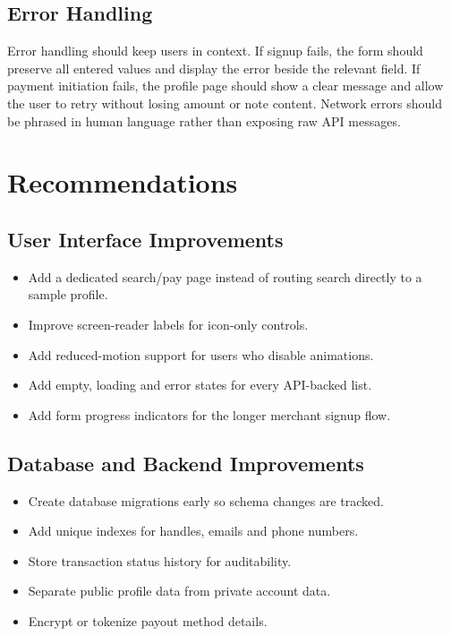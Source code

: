 \documentclass[12pt,a4paper]{article}
\begin{document}
\subsection{Error Handling}
Error handling should keep users in context. If signup fails, the form should preserve all entered values and display the error beside the relevant field. If payment initiation fails, the profile page should show a clear message and allow the user to retry without losing amount or note content. Network errors should be phrased in human language rather than exposing raw API messages.

\section{Recommendations}

\subsection{User Interface Improvements}
\begin{itemize}
    \item Add a dedicated search/pay page instead of routing search directly to a sample profile.
    \item Improve screen-reader labels for icon-only controls.
    \item Add reduced-motion support for users who disable animations.
    \item Add empty, loading and error states for every API-backed list.
    \item Add form progress indicators for the longer merchant signup flow.
\end{itemize}

\subsection{Database and Backend Improvements}
\begin{itemize}
    \item Create database migrations early so schema changes are tracked.
    \item Add unique indexes for handles, emails and phone numbers.
    \item Store transaction status history for auditability.
    \item Separate public profile data from private account data.
    \item Encrypt or tokenize payout method details.
\end{itemize}
\end{document}
